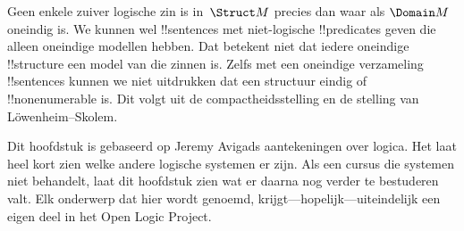 \documentclass[openany]{memoir}
\begin{document}
Geen enkele zuiver logische zin is in~$\Struct M$ precies dan waar als
$\Domain M$ oneindig is. We kunnen wel !!{sentence}s met niet-logische
!!{predicate}s geven die alleen oneindige modellen hebben. Dat betekent
niet dat iedere oneindige !!{structure} een model van die zinnen is.
Zelfs met een oneindige verzameling !!{sentence}s kunnen we niet
uitdrukken dat een structuur eindig of !!{nonenumerable} is. Dit volgt
uit de compactheidsstelling en de stelling van
L\"owenheim--Skolem.
\endgroup
\OLEndChapterHook

\begingroup
\def\olfilename{OLP-0174}
\def\olfilepath{content/first-order-logic/beyond/}
\hypertarget{unit-OLP-0174}{}




\begin{editorial}
  Dit hoofdstuk is gebaseerd op Jeremy Avigads aantekeningen over
  logica. Het laat heel kort zien welke andere logische systemen er
  zijn. Als een cursus die systemen niet behandelt, laat dit hoofdstuk
  zien wat er daarna nog verder te bestuderen valt. Elk onderwerp dat
  hier wordt genoemd, krijgt---hopelijk---uiteindelijk een eigen deel
  in het Open Logic Project.
\end{editorial}
\endgroup

\begingroup
\def\olfilename{OLP-0175}
\def\olfilepath{content/first-order-logic/beyond/}
\hypertarget{unit-OLP-0175}{}




\end{document}
